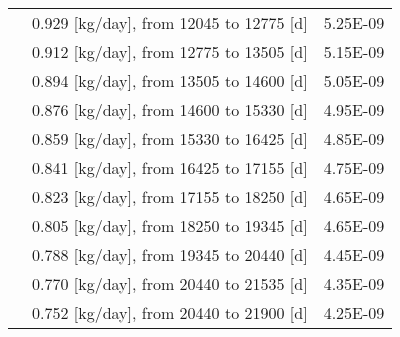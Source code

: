 \begin{longtable}{|p{}|p{}|p{}|}
	& 0.929  [kg/day], from 12045 to 12775 [d] &	5.25E-09 \\
	&  0.912   [kg/day], from 12775 to 13505 [d] &	5.15E-09 \\
	&   0.894  [kg/day], from 13505 to 14600 [d] &	5.05E-09 \\
	&  0.876 [kg/day], from 14600 to 15330 [d] &	4.95E-09 \\
	& 0.859   [kg/day], from 15330 to 16425 [d] &	4.85E-09 \\
	&  0.841 [kg/day], from 16425 to 17155 [d] &	4.75E-09 \\
	&  0.823 [kg/day], from 17155 to 18250 [d] &	4.65E-09 \\
	&  0.805 [kg/day], from 18250 to 19345 [d] &	4.65E-09 \\
	& 0.788  [kg/day], from 19345 to 20440 [d] &	4.45E-09 \\
	&  0.770 [kg/day], from 20440 to 21535 [d] &	4.35E-09 \\
	& 0.752 [kg/day], from 20440 to 21900 [d] &	4.25E-09 \\
	\hline
\end{longtable}
